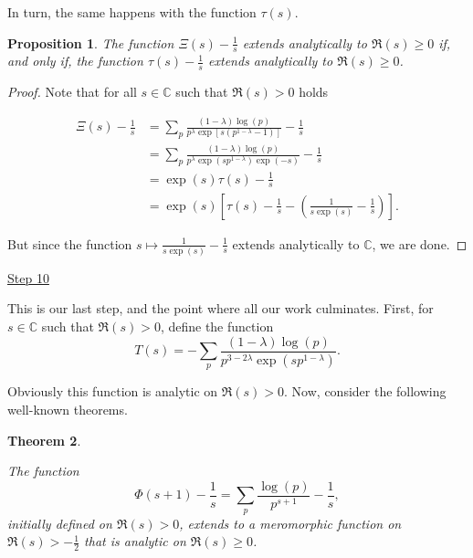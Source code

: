 \documentclass[11pt]{amsart}
\newtheorem{theorem}{Theorem}[section]
\newtheorem{proposition}[theorem]{Proposition}
\numberwithin{equation}{section}
\newcommand{\C}{\mathbb{C}}
\newcommand{\disum}{\displaystyle \sum}
\newcommand{\difrac}{\displaystyle \frac}
\begin{document}
\vspace{5mm} In turn, the same happens with the function $\tau(s)$.

\vspace{3mm} \begin{proposition}

The function $\Xi(s) - \difrac{1}{s}$ extends analytically to $\Re(s) \geq 0$ if, and only if, the function $\tau(s) - \difrac{1}{s}$ extends analytically to $\Re(s) \geq 0$.

\end{proposition}

\vspace{3mm} \begin{proof} Note that for all $s \in \C$ such that $\Re(s) > 0$ holds

\begin{equation*} \begin{split} \Xi(s) - \difrac{1}{s} & = \disum_p \difrac{(1 - \lambda)\log(p)}{p^\lambda \exp[s(p^{1 - \lambda} - 1)]} - \difrac{1}{s} \\ & = \disum_p \difrac{(1 - \lambda)\log(p)}{p^\lambda \exp(sp^{1 - \lambda}) \exp(-s)} - \difrac{1}{s} \\ & = \exp(s) \tau(s) - \difrac{1}{s} \\ & = \exp(s) \left[\tau(s) - \difrac{1}{s} - \left(\difrac{1}{s \exp(s)} - \difrac{1}{s}\right)\right]. \end{split} \end{equation*}

\vspace{3mm} But since the function $s \mapsto \difrac{1}{s \exp(s)} - \difrac{1}{s}$ extends analytically to $\C$, we are done. \end{proof}

\newpage

\begin{center} \underline{Step 10} \end{center}

This is our last step, and the point where all our work culminates. First, for $s \in \C$ such that $\Re(s) > 0$, define the function $$T(s) = -\disum_p \difrac{(1 - \lambda) \log(p)}{p^{3 - 2\lambda} \exp(sp^{1 - \lambda})}.$$

Obviously this function is analytic on $\Re(s) > 0$. Now, consider the following well-known theorems.

\begin{theorem} \label{wellknowntheorem}

The function $$\Phi(s + 1) - \difrac{1}{s} = \disum_p \difrac{\log(p)}{p^{s + 1}} - \difrac{1}{s},$$ initially defined on $\Re(s) > 0$, extends to a meromorphic function on $\Re(s) > -\difrac{1}{2}$ that is analytic on $\Re(s) \geq 0$.

\end{theorem}
\end{document}
